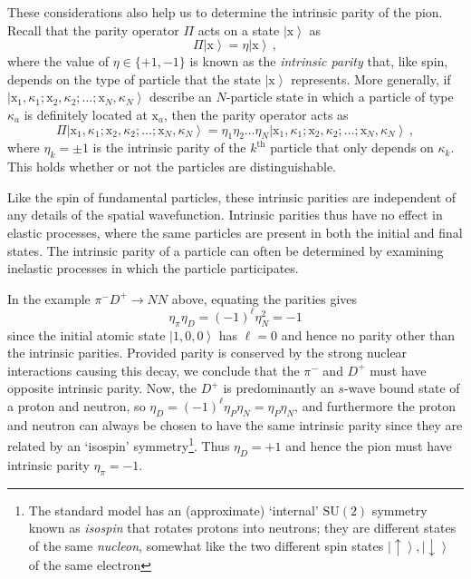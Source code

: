 \documentclass{article}
\theoremstyle{plain}\theoremheaderfont{\normalfont\itshape}\theorembodyfont{\rmfamily}\theoremseparator{.}\newtheorem*{rem}{Remark}\newtheorem*{ex}{Example}\newtheorem*{proof}{Proof}\newtheorem*{altp}{Alternative proof}
\theoremstyle{plain}\theoremheaderfont{\normalfont\bfseries}\theorembodyfont{\rmfamily}\theoremseparator{.}\newtheorem{thm}{Theorem}[section]\newtheorem{lem}[thm]{Lemma}\newtheorem{prop}[thm]{Proposition}\newtheorem*{cor}{Corollary}\newtheorem{defn}[thm]{Definition}\newtheorem{clm}[thm]{Claim}\newtheorem{clminproof}{Claim}
\theoremstyle{break}\theoremheaderfont{\normalfont\itshape}\theorembodyfont{\rmfamily}\theoremseparator{.\medskip}\newtheorem*{proofskip}{Proof}\newtheorem*{exs}{Examples}\newtheorem*{rems}{Remarks}
\theoremstyle{break}\theoremheaderfont{\normalfont\bfseries}\theorembodyfont{\rmfamily}\theoremseparator{.\medskip}\newtheorem{lemskip}[thm]{Lemma}\newtheorem{defnskip}[thm]{Definition}\newtheorem{propskip}[thm]{Proposition}\newtheorem{thmskip}[thm]{Theorem}
\numberwithin{equation}{section}
\newcommand{\ket}[1]{\left| #1 \right\rangle}
\newcommand{\vb}[1]{\bm{\mathrm{#1}}}
\newcommand{\SU}{\mathrm{SU}}
\begin{document}
    These considerations also help us to determine the intrinsic parity of the pion. Recall that the parity operator \(\Pi\) acts on a state \(\ket{\vb{x}}\) as
    \begin{equation}
        \Pi\ket{\vb{x}}=\eta\ket{\vb{x}}\,,
    \end{equation}
    where the value of \(\eta\in\{+1,-1\}\) is known as the \textit{intrinsic parity} that, like spin, depends on the type of particle that the state \(\ket{\vb{x}}\) represents. More generally, if \(\ket{\vb{x}_1,\kappa_1;\vb{x}_2,\kappa_2;\dots;\vb{x}_N,\kappa_N}\) describe an \(N\)-particle state in which a particle of type \(\kappa_a\) is definitely located at \(\vb{x}_a\), then the parity operator acts as
    \begin{equation}
        \Pi\ket{\vb{x}_1,\kappa_1;\vb{x}_2,\kappa_2;\dots;\vb{x}_N,\kappa_N}=\eta_1\eta_2\dots\eta_N\ket{\vb{x}_1,\kappa_1;\vb{x}_2,\kappa_2;\dots;\vb{x}_N,\kappa_N}\,,
    \end{equation}
    where \(\eta_k=\pm 1\) is the intrinsic parity of the \(k^{\text{th}}\) particle that only depends on \(\kappa_k\). This holds whether or not the particles are distinguishable.

    Like the spin of fundamental particles, these intrinsic parities are independent of any details of the spatial wavefunction. Intrinsic parities thus have no effect in elastic processes, where the same particles are present in both the initial and final states. The intrinsic parity of a particle can often be determined by examining inelastic processes in which the particle
    participates.

    In the example \(\pi^- D^+\to N N\) above, equating the parities gives
    \begin{equation}
        \eta_\pi\eta_D=(-1)^\ell\eta_N^2=-1
    \end{equation}
    since the initial atomic state \(\ket{1,0,0}\) has \(\ell=0\) and hence no parity other than the intrinsic parities. Provided parity is conserved by the strong nuclear interactions causing this decay, we conclude that the \(\pi^-\) and \(D^+\) must have opposite intrinsic parity. Now, the \(D^+\) is predominantly an \(s\)-wave bound state of a proton and neutron, so \(\eta_D=(-1)^\ell\eta_P\eta_N=\eta_P\eta_N\), and furthermore the proton and neutron can always be chosen to have the same intrinsic parity since they are related by an `isospin' symmetry\footnote{The standard model has an (approximate) `internal' \(\SU(2)\) symmetry known as \textit{isospin} that rotates protons into neutrons; they are different states of the same \textit{nucleon}, somewhat like the two different spin states \(\ket{\uparrow},\ket{\downarrow}\) of the same electron}. Thus \(\eta_D=+1\) and hence the pion must have intrinsic parity \(\eta_\pi=-1\).
\end{document}
